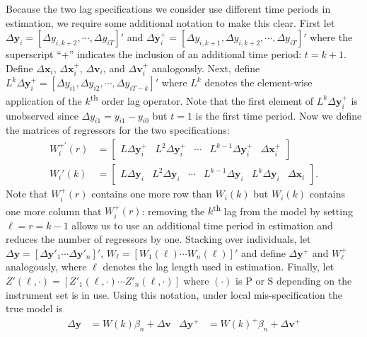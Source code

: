 Because the two lag specifications we consider use different time periods in estimation, we require some additional notation to make this clear. 
First let
$\Delta \mathbf{y}_{i} = [\Delta y_{i,k+2}, \cdots, \Delta y_{iT}]'$ and $\Delta \mathbf{y}^+_{i} = [\Delta y_{i,k+1}, \Delta y_{i,k+2}, \cdots, \Delta y_{iT}]'$ 
where the superscript ``+'' indicates the inclusion of an additional time period: $t = k+1$.
Define $\Delta \mathbf{x}_i$, $\Delta \mathbf{x}_{i}^{+}$, $\Delta \mathbf{v}_i$, and $\Delta \mathbf{v}_{i}^{+}$ analogously.
Next, define $L^k\Delta \mathbf{y}_i^{+} = [\Delta y_{i1}, \Delta y_{i2}, \cdots, \Delta y_{iT-k}]'$ where $L^k$ denotes the element-wise application of the $k$\textsuperscript{th} order lag operator.
Note that the first element of $L^k\Delta \mathbf{y}_{i}^{+}$ is unobserved since $\Delta y_{i1} = y_{i1} - y_{i0}$ but $t=1$ is the first time period.
Now we define the matrices of regressors for the two specifications: 
\begin{align*}
  W_i^{+'}(r) &= \left[
  \begin{array}{ccccc}
    L \Delta \mathbf{y}_i^{+} &  L^2 \Delta \mathbf{y}_i^{+} & \cdots & L^{k-1}\Delta \mathbf{y}_i^{+} & \Delta \mathbf{x}_i^+
  \end{array}
\right]\\
  W_i'(k) &= \left[
  \begin{array}{cccccc}
    L \Delta \mathbf{y}_i &  L^2 \Delta \mathbf{y}_i & \cdots & L^{k-1}\Delta \mathbf{y}_i & L^k\Delta \mathbf{y}_i & \Delta \mathbf{x}_i
  \end{array}
\right].
\end{align*}
Note that $W_i^{+}(r)$ contains one more row than $W_i(k)$ but $W_i(k)$ contains one more column that $W_i^{+}(r)$: removing the $k$\textsuperscript{th} lag from the model by setting $\ell = r = k-1$ allows us to use an additional time period in estimation and reduces the number of regressors by one. 
Stacking over individuals, let $\Delta \mathbf{y} = [\Delta \mathbf{y}'_1 \cdots \Delta \mathbf{y}'_n]'$, $W_\ell = [W_1(\ell) \cdots W_n(\ell)]'$ and define $\Delta \mathbf{y}^{+}$ and $W_\ell^{+}$ analogously, where $\ell$ denotes the lag length used in estimation.
Finally, let $Z'(\ell,\cdot) = [Z'_1(\ell,\cdot) \cdots Z'_n(\ell,\cdot)]$ where $(\cdot)$ is $\text{P}$ or $\text{S}$ depending on the instrument set is in use.
Using this notation, under local mis-specification the true model is
\begin{align}
  \Delta \mathbf{y} &= W(k)\beta_n + \Delta \mathbf{v} &  \Delta \mathbf{y}^{+} &= W(k)^{+}\beta_n + \Delta \mathbf{v}^+
\end{align}
